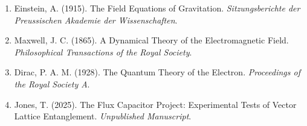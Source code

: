 \documentclass[12pt]{article}
\begin{document}
\begin{enumerate}
    \item Einstein, A. (1915). The Field Equations of Gravitation. \textit{Sitzungsberichte der Preussischen Akademie der Wissenschaften}.
    \item Maxwell, J. C. (1865). A Dynamical Theory of the Electromagnetic Field. \textit{Philosophical Transactions of the Royal Society}.
    \item Dirac, P. A. M. (1928). The Quantum Theory of the Electron. \textit{Proceedings of the Royal Society A}.
    \item Jones, T. (2025). The Flux Capacitor Project: Experimental Tests of Vector Lattice Entanglement. \textit{Unpublished Manuscript}.
\end{enumerate}
\end{document}

